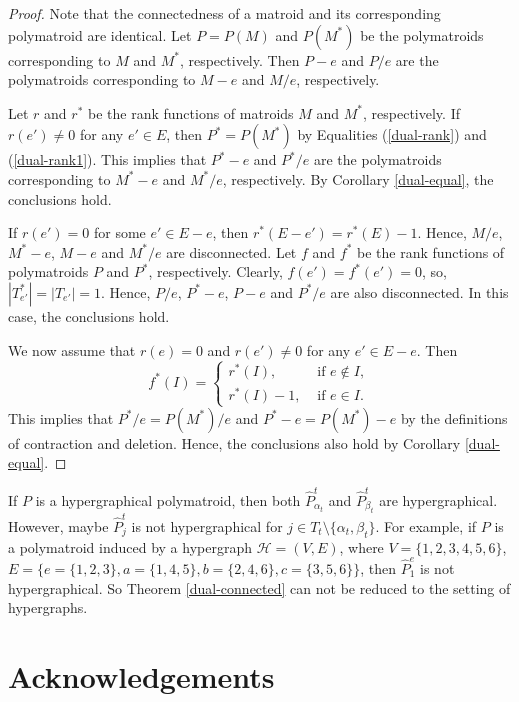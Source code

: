 \documentclass[preprint,10pt]{elsarticle}
\theoremstyle{plain}
\theoremstyle{definition}
\theoremstyle{remark}
\begin{document}
\begin{proof}
Note that the connectedness of a matroid and its corresponding polymatroid are identical.
Let $P=P(M)$ and $P(M^*)$ be the polymatroids corresponding to $M$ and $M^*$, respectively. Then $P-e$ and $P/e$ are the polymatroids corresponding to $M-e$ and $M/e$, respectively.

Let $r$ and $r^*$ be the rank functions of matroids $M$ and $M^*$, respectively. If $r(e')\neq 0$ for any $e'\in E$, then $P^*=P(M^*)$ by Equalities (\ref{dual-rank}) and (\ref{dual-rank1}). This implies that $P^*-e$ and $P^*/e$ are the polymatroids corresponding to $M^*-e$ and $M^*/e$, respectively. By Corollary \ref{dual-equal}, the conclusions hold.

If $r(e')= 0$ for some $e'\in E-e$, then $r^*(E-e')=r^*(E)-1$. Hence, $M/e$, $M^*-e$,  $M-e$ and $M^*/e$ are disconnected. Let $f$ and $f^*$ be the rank functions of polymatroids $P$ and $P^*$, respectively. Clearly, $f(e')=f^*(e')=0$, so, $|T^*_{e'}|=|T_{e'}|=1$. Hence, $P/e$, $P^*-e$,  $P- e$ and $P^*/e$ are also disconnected. In this case, the conclusions hold.


We now assume that $r(e)= 0$ and $r(e')\neq 0$ for any $e'\in E-e$. Then 	
\begin{equation*}\label{Tutte-DC}
				f^*(I)=\left\{\begin{array}{ll}
					r^*(I),&\text{ if } e\notin I,\\
                    r^*(I)-1,&\text{ if } e\in I.
				\end{array}\right.
			\end{equation*}
This implies that $P^*/e=P(M^*)/e$ and $P^*- e=P(M^*)-e$ by the definitions of contraction and deletion. Hence, the conclusions also hold by Corollary \ref{dual-equal}.
\end{proof}

If $P$ is a hypergraphical polymatroid, then both $\widehat{P}^{t}_{\alpha_{t}}$ and $\widehat{P}^{t}_{\beta_{t}}$ are hypergraphical. However,  maybe $\widehat{P}^{t}_{j}$ is not hypergraphical for $j\in T_{t}\setminus \{\alpha_{t}, \beta_{t}\}$. For example, if $P$ is a polymatroid induced by a hypergraph $\mathcal{H}=(V,E)$, where $V=\{1,2,3,4,5,6\}$, $E=\{e=\{1,2,3\},a=\{1,4,5\},b=\{2,4,6\},c=\{3,5,6\}\}$, then $\widehat{P}^{e}_{1}$ is not hypergraphical.
So Theorem \ref{dual-connected} can not be reduced to the setting of hypergraphs.

\section*{Acknowledgements}
\noindent
\end{document}

